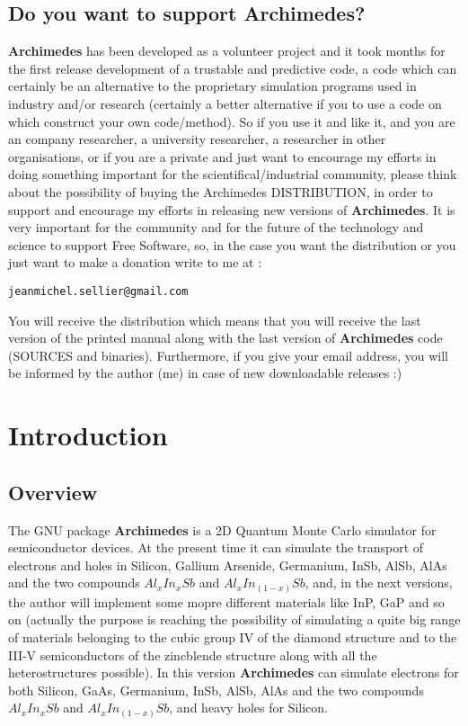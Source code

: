 \documentclass[12pt]{book}
\begin{document}
\section{Do you want to support \textbf{Archimedes}?}
\textbf{Archimedes} has been developed as a volunteer project and it took months for the first release development of a trustable and predictive code, a code which can certainly be an alternative to the proprietary simulation programs used in industry and/or research (certainly a better alternative if you to use a code on which construct your own code/method). So if you use it and like it, and you are an company researcher, a university researcher, a researcher in other organisations, or if you are a private and just want to encourage my efforts in doing something important for the scientifical/industrial community, please think about the possibility of buying the Archimedes DISTRIBUTION, in order to support and encourage my efforts in releasing new versions of \textbf{Archimedes}. It is very important for the community and for the future of the technology and science to support Free Software, so, in the case you want the distribution or you just want to make a donation write to me at :
\begin{verbatim}
jeanmichel.sellier@gmail.com

\end{verbatim}
You will receive the distribution which means that you will receive the last version of the printed manual along with the last version of \textbf{Archimedes} code (SOURCES and binaries). Furthermore, if you give your email address, you will be informed by the author (me) in case of new downloadable releases :) 


\chapter{Introduction}

\section{Overview}

The GNU package \textbf{Archimedes} is a 2D Quantum Monte Carlo simulator for semiconductor devices. At the present time it can simulate the transport of electrons and holes in Silicon, Gallium Arsenide, Germanium, InSb, AlSb, AlAs and the two compounds $Al_xIn_xSb$ and $Al_xIn_{(1-x)}Sb$, and, in the next versions, the author will implement some mopre different materials like InP, GaP and so on (actually the purpose is reaching the possibility of simulating a quite big range of materials belonging to the cubic group IV of the diamond structure and to the III-V semiconductors of the zincblende structure along with all the heterostructures possible). In this version \textbf{Archimedes} can simulate electrons for both Silicon, GaAs, Germanium, InSb, AlSb, AlAs and the two compounds $Al_xIn_xSb$ and $Al_xIn_{(1-x)}Sb$, and heavy holes for Silicon.
\end{document}
